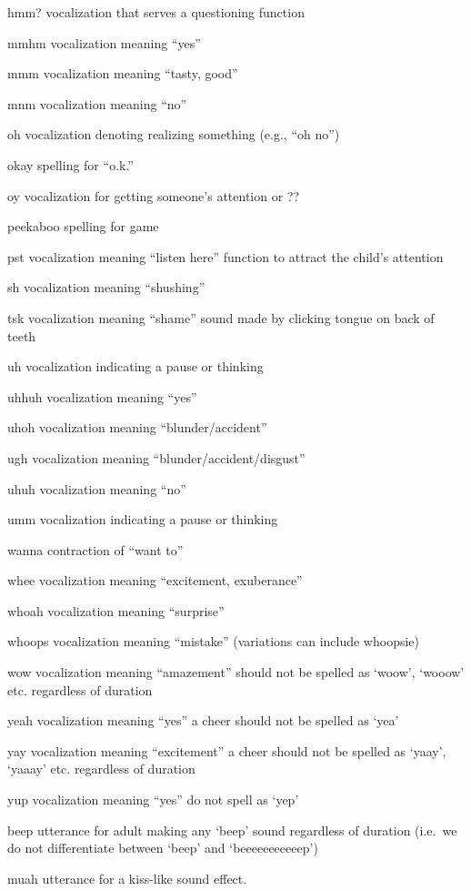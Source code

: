 \documentclass[
]{book}
\begin{document}
hmm?
vocalization that serves a questioning function

mmhm
vocalization meaning ``yes''

mmm
vocalization meaning ``tasty, good''

mnm
vocalization meaning ``no''

oh
vocalization denoting realizing something (e.g., ``oh no'')

okay
spelling for ``o.k.''

oy
vocalization for getting someone's attention or ??

peekaboo
spelling for game

pst
vocalization meaning ``listen here''
function to attract the child's attention

sh
vocalization meaning ``shushing''

tsk
vocalization meaning ``shame''
sound made by clicking tongue on back of teeth

uh
vocalization indicating a pause or thinking

uhhuh
vocalization meaning ``yes''

uhoh
vocalization meaning ``blunder/accident''

ugh
vocalization meaning ``blunder/accident/disgust''

uhuh
vocalization meaning ``no''

umm
vocalization indicating a pause or thinking

wanna
contraction of ``want to''

whee
vocalization meaning ``excitement, exuberance''

whoah
vocalization meaning ``surprise''

whoops
vocalization meaning ``mistake'' (variations can include whoopsie)

wow
vocalization meaning ``amazement''
should not be spelled as `woow', `wooow' etc. regardless of duration

yeah
vocalization meaning ``yes''
a cheer
should not be spelled as `yea'

yay
vocalization meaning ``excitement''
a cheer
should not be spelled as `yaay', `yaaay' etc. regardless of duration

yup
vocalization meaning ``yes''
do not spell as `yep'

beep
utterance for adult making any `beep' sound regardless of duration (i.e.~we do not differentiate between `beep' and `beeeeeeeeeeep')

muah
utterance for a kiss-like sound effect.
\end{document}
